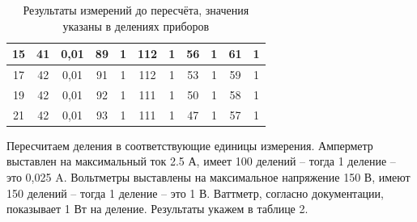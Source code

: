 \documentclass[a4paper, fontsize = 14pt]{article}
\begin{document}
\begin{table}[hbt]
{\begin{tabular}{|c|c|c|c|c|c|c|c|c|c|c|}
15               & 41                & 0,01                     & 89                  & 1                            & 112                     & 1                                & 56                    & 1                            & 61                  & 1                            \\ \hline
17               & 42                & 0,01                     & 91                  & 1                            & 112                     & 1                                & 53                    & 1                            & 59                  & 1                            \\ \hline
19               & 42                & 0,01                     & 92                  & 1                            & 111                     & 1                                & 50                    & 1                            & 58                  & 1                            \\ \hline
21               & 42                & 0,01                     & 93                  & 1                            & 111                     & 1                                & 47                    & 1                            & 57                  & 1                            \\ \hline
\end{tabular}
}
\caption{Результаты измерений до пересчёта, значения указаны в делениях приборов}
\end{table}

Пересчитаем деления в соответствующие единицы измерения. Амперметр выставлен на максимальный ток 2.5 А, имеет 100 делений -- тогда 1 деление -- это 0,025 A. Вольтметры выставлены на максимальное напряжение 150 В, имеют 150 делений -- тогда 1 деление -- это 1 В. Ваттметр, согласно документации, показывает 1 Вт на деление. Результаты укажем в таблице 2.
\end{document}
